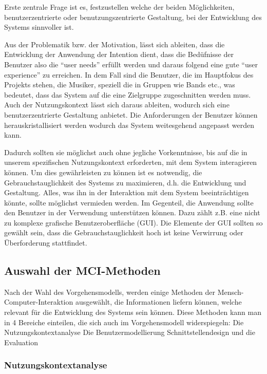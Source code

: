 \documentclass[12pt]{scrartcl}
\begin{document}
Erste zentrale Frage ist es, festzustellen welche der beiden Möglichkeiten, benutzerzentrierte oder benutzungszentrierte Gestaltung, bei der Entwicklung des Systems sinnvoller ist.

Aus der Problematik bzw. der Motivation, lässt sich ableiten, dass die Entwicklung der Anwendung der Intention dient, dass die Bedüfnisse der Benutzer also die “user needs” erfüllt werden und daraus folgend eine gute “user experience” zu erreichen. 
In dem Fall sind die Benutzer, die im Hauptfokus des Projekts stehen, die Musiker, speziell die in Gruppen wie Bands etc., was bedeutet, dass das System auf die eine Zielgruppe zugeschnitten werden muss. Auch der Nutzungskontext lässt sich daraus ableiten, wodurch sich eine benutzerzentrierte Gestaltung anbietet. Die Anforderungen der Benutzer können herauskristallisiert werden wodurch das System weitesgehend angepasst werden kann.

Dadurch sollten sie möglichst auch ohne jegliche Vorkenntnisse, bis auf die in unserem spezifischen Nutzungskontext erforderten, mit dem System interagieren können.
Um dies gewährleisten zu können ist es notwendig, die Gebrauchstauglichkeit des Systems zu maximieren, d.h. die Entwicklung und Gestaltung. Alles, was ihn in der Interaktion mit dem System beeinträchtigen könnte, sollte möglichst vermieden werden. Im Gegenteil, die Anwendung sollte den Benutzer in der Verwendung unterstützen können. Dazu zählt z.B. eine nicht zu komplexe grafische Benutzeroberfläche (GUI). Die Elemente der GUI sollten so gewählt sein, dass die Gebrauchstauglichkeit hoch ist keine Verwirrung oder Überforderung stattfindet.


\subsection{Auswahl der MCI-Methoden}

Nach der Wahl des Vorgehensmodells, werden einige Methoden der Mensch-Computer-Interaktion ausgewählt, die Informationen liefern können, welche relevant für die Entwicklung des Systems sein können.
Diese Methoden kann man in 4 Bereiche einteilen, die sich auch im Vorgehensmodell widerspiegeln:
Die Nutzungskontextanalyse
Die Benutzermodellierung
Schnittstellendesign und die
Evaluation

\subsubsection{Nutzungskontextanalyse}
\end{document}
